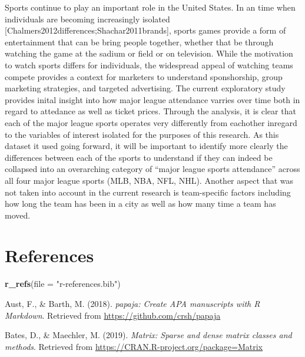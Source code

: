 \documentclass[man, fleqn, noextraspace,floatsintext]{apa6}
\newenvironment{Shaded}{\begin{snugshade}}{\end{snugshade}}
\newcommand{\DataTypeTok}[1]{\textcolor[rgb]{0.13,0.29,0.53}{#1}}
\newcommand{\KeywordTok}[1]{\textcolor[rgb]{0.13,0.29,0.53}{\textbf{#1}}}
\newcommand{\NormalTok}[1]{#1}
\newcommand{\StringTok}[1]{\textcolor[rgb]{0.31,0.60,0.02}{#1}}
\begin{document}
Sports continue to play an important role in the United States. In an time when individuals are becoming increasingly isolated {[}Chalmers2012differences;Shachar2011brands{]}, sports games provide a form of entertainment that can be bring people together, whether that be through watching the game at the sadium or field or on television. While the motivation to watch sports differs for individuals, the widespread appeal of watching teams compete provides a context for marketers to understand sponshorship, group marketing strategies, and targeted advertising.
The current exploratory study provides inital insight into how major league attendance varries over time both in regard to attedance as well as ticket prices. Through the analysis, it is clear that each of the major league sports operates very differently from eachother inregard to the variables of interest isolated for the purposes of this research.
As this dataset it used going forward, it will be important to identify more clearly the differences between each of the sports to understand if they can indeed be collapsed into an overarching category of \enquote{major league sports attendance} across all four major league sports (MLB, NBA, NFL, NHL). Another aspect that was not taken into account in the current research is team-specific factors including how long the team has been in a city as well as how many time a team has moved.

\newpage

\hypertarget{references}{%
\section{References}\label{references}}

\begin{Shaded}
\begin{Highlighting}[]
\KeywordTok{r_refs}\NormalTok{(}\DataTypeTok{file =} \StringTok{"r-references.bib"}\NormalTok{)}
\end{Highlighting}
\end{Shaded}

\begingroup
\setlength{\parindent}{-0.5in}
\setlength{\leftskip}{0.5in}

\hypertarget{refs}{}
\leavevmode\hypertarget{ref-R-papaja}{}%
Aust, F., \& Barth, M. (2018). \emph{papaja: Create APA manuscripts with R Markdown}. Retrieved from \url{https://github.com/crsh/papaja}

\leavevmode\hypertarget{ref-R-Matrix}{}%
Bates, D., \& Maechler, M. (2019). \emph{Matrix: Sparse and dense matrix classes and methods}. Retrieved from \url{https://CRAN.R-project.org/package=Matrix}
\end{document}
